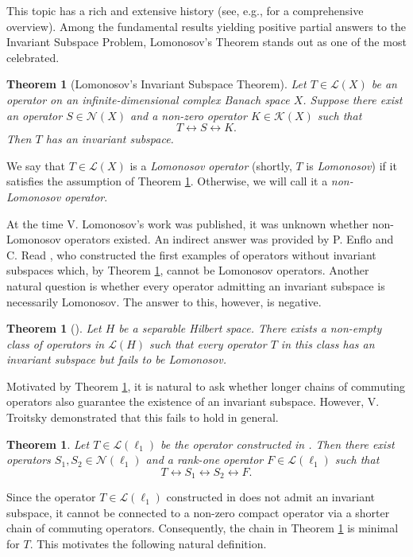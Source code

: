 \documentclass[a4paper,12pt]{article}
\newtheorem{theorem}[thm]{Theorem}
\theoremstyle{definition}
\numberwithin{equation}{section}
\numberwithin{thm}{section}
\begin{document}
This topic has a rich and extensive history (see, e.g., \cite{InvariantSubspaces} for a comprehensive overview). Among the fundamental results yielding positive partial answers to the Invariant Subspace Problem, Lomonosov's Theorem \cite{Lomonosov73} stands out as one of the most celebrated.

\begin{theorem}[Lomonosov's Invariant Subspace Theorem]
\label{Lomonosov}
Let $T \in \mathcal{L}(X)$ be an operator on an infinite-dimensional complex Banach space $X$. Suppose there exist an operator $S \in \mathcal{N}(X)$ and a non-zero operator $K \in \mathcal{K}(X)$ such that 
$$T \leftrightarrow S \leftrightarrow K.$$
Then $T$ has an invariant subspace. 
\end{theorem}
We say that $T\in \mathcal{L}(X)$ is a \textit{Lomonosov operator} (shortly, $T$ is \textit{Lomonosov}) if it satisfies the assumption of Theorem \ref{Lomonosov}. Otherwise, we will call it a \textit{non-Lomonosov operator}.

At the time V. Lomonosov's work was published, it was unknown whether non-Lomonosov operators existed. An indirect answer was provided by P. Enflo \cite{Enflo} and C. Read \cite{Read1985, Read1986}, who constructed the first examples of operators without invariant subspaces which, by Theorem \ref{Lomonosov}, cannot be Lomonosov operators. Another natural question is whether every operator admitting an invariant subspace is necessarily Lomonosov. The answer to this, however, is negative.

\begin{theorem}[\cite{Hadwin}]
\label{Hadwin}
Let $H$ be a separable Hilbert space. There exists a non-empty class of operators in $\mathcal{L}(H)$ such that every operator $T$ in this class has an invariant subspace but fails to be Lomonosov.
\end{theorem}
Motivated by Theorem \ref{Lomonosov}, it is natural to ask whether longer chains of commuting operators also guarantee the existence of an invariant subspace. However, V. Troitsky \cite{Troitsky} demonstrated that this fails to hold in general.
\begin{theorem}
\label{VT}
Let $T\in \mathcal{L}(\ell_1)$ be the operator constructed in \cite{Read1986}. Then there exist operators $S_1, S_2 \in \mathcal{N}(\ell_1)$ and a rank-one operator $F\in \mathcal{L}(\ell_1)$ such that
$$T \leftrightarrow S_1 \leftrightarrow S_2 \leftrightarrow F.$$
\end{theorem}
Since the operator $T\in \mathcal{L}(\ell_1)$ constructed in \cite{Read1986} does not admit an invariant subspace, it cannot be connected to a non-zero compact operator via a shorter chain of commuting operators. Consequently, the chain in Theorem \ref{VT} is minimal for $T$. This motivates the following natural definition.
\end{document}
